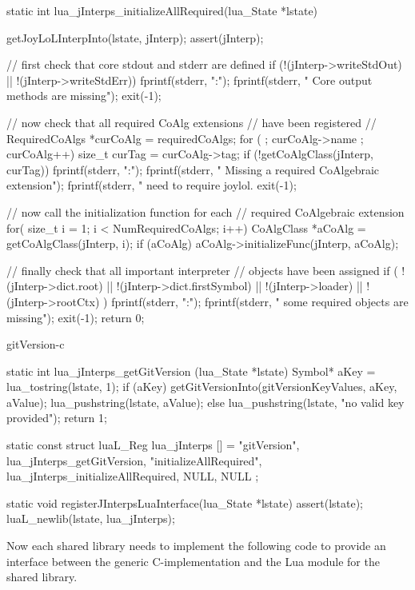 \startCCode
static int lua_jInterps_initializeAllRequired(lua_State *lstate) {
  getJoyLoLInterpInto(lstate, jInterp);
  assert(jInterp);
  
  // first check that core stdout and stderr are defined
  if (!(jInterp->writeStdOut) || !(jInterp->writeStdErr)) {
    fprintf(stderr, "\nERROR:\n");
    fprintf(stderr, "  Core output methods are missing\n");
    exit(-1);
  }
  
  // now check that all required CoAlg extensions 
  // have been registered
  //
  RequiredCoAlgs *curCoAlg = requiredCoAlgs;
  for ( ; curCoAlg->name ; curCoAlg++) {
    size_t curTag = curCoAlg->tag;
    if (!getCoAlgClass(jInterp, curTag)) {
      fprintf(stderr, "\nERROR:\n");
      fprintf(stderr, "  Missing a required CoAlgebraic extension\n");
      fprintf(stderr, "  need to require joylol.%
      exit(-1);
    }
  }

  // now call the initialization function for each 
  // required CoAlgebraic extension
  for( size_t i = 1; i < NumRequiredCoAlgs; i++) {
    CoAlgClass *aCoAlg = getCoAlgClass(jInterp, i);
    if (aCoAlg) {
      aCoAlg->initializeFunc(jInterp, aCoAlg);
    }
  }
  
  // finally check that all important interpreter 
  // objects have been assigned
  if (
    !(jInterp->dict.root) || 
    !(jInterp->dict.firstSymbol) ||
    !(jInterp->loader) ||
    !(jInterp->rootCtx)
    ) {
      fprintf(stderr, "\nERROR:\n");
      fprintf(stderr, "  some required objects are missing\n\n");
      exit(-1);
    }
  return 0;
}
\stopCCode

\component gitVersion-c

\startCCode
static int lua_jInterps_getGitVersion (lua_State *lstate) {
  Symbol* aKey   = lua_tostring(lstate, 1);
  if (aKey) {
    getGitVersionInto(gitVersionKeyValues, aKey, aValue);
    lua_pushstring(lstate, aValue);
  } else {
    lua_pushstring(lstate, "no valid key provided");
  }
  return 1;
}
\stopCCode

\startCCode
static const struct luaL_Reg lua_jInterps [] = {
  {"gitVersion",            lua_jInterps_getGitVersion},
  {"initializeAllRequired", lua_jInterps_initializeAllRequired},
  {NULL, NULL}
};
\stopCCode

\startCCode
static void registerJInterpsLuaInterface(lua_State *lstate) {
  assert(lstate);
  luaL_newlib(lstate, lua_jInterps);
}
\stopCCode

Now each shared library needs to implement the following code to provide 
an interface between the generic C-implementation and the Lua module for 
the shared library. 

